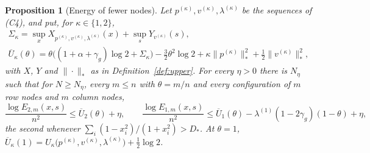 \documentclass[11pt]{article}
\newtheorem{proposition}[theorem]{Proposition}
\theoremstyle{definition}
\begin{document}
\begin{proposition}[Energy of fewer nodes]\label{xprop:mass}
Let $p^{(\kappa)},v^{(\kappa)},\lambda^{(\kappa)}$ be the sequences of (C4), and put, for $\kappa\in\{1,2\}$,
\begin{gather*}
\Sigma_\kappa=\sup_{x}X_{p^{(\kappa)},v^{(\kappa)},\lambda^{(\kappa)}}(x)+\sup_sY_{v^{(\kappa)}}(s),\\
\overline U_\kappa(\theta)=\theta\big((1+\alpha+\gamma_g)\log2+\Sigma_\kappa\big)-\tfrac32\theta^2\log2+\kappa\|p^{(\kappa)}\|_*^2+\tfrac12\|v^{(\kappa)}\|_*^2 ,
\end{gather*}
with $X$, $Y$ and $\|\cdot\|_*$ as in Definition~\ref{def:upper}. For every $\eta>0$ there is $N_\eta$ such that for $N\ge N_\eta$, every $m\le n$ with $\theta=m/n$ and every configuration of $m$ row nodes and $m$ column nodes,
\[
\frac{\log E_{2,m}(x,s)}{n^2}\le\overline U_2(\theta)+\eta,\qquad
\frac{\log E_{1,m}(x,s)}{n^2}\le\overline U_1(\theta)-\lambda^{(1)}(1-2\gamma_g)(1-\theta)+\eta,
\]
the second whenever $\sum_i(1-x_i^2)/(1+x_i^2)>D_*$. At $\theta=1$, $\overline U_\kappa(1)=U_\kappa\big(p^{(\kappa)},v^{(\kappa)},\lambda^{(\kappa)}\big)+\frac12\log2$.
\end{proposition}
\end{document}
